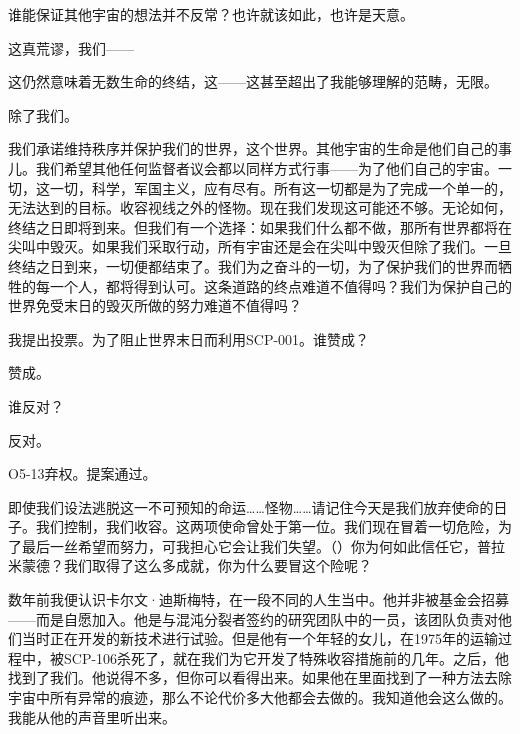 \begin{greenrecordbox}
谁能保证其他宇宙的想法并不反常？也许就该如此，也许是天意。

这真荒谬，我们——

这仍然意味着无数生命的终结，这——这甚至超出了我能够理解的范畴，无限。

除了我们。


我们承诺维持秩序并保护我们的世界，这个世界。其他宇宙的生命是他们自己的事儿。我们希望其他任何监督者议会都以同样方式行事——为了他们自己的宇宙。一切，这一切，科学，军国主义，应有尽有。所有这一切都是为了完成一个单一的，无法达到的目标。收容视线之外的怪物。现在我们发现这可能还不够。无论如何，终结之日即将到来。但我们有一个选择：如果我们什么都不做，那所有世界都将在尖叫中毁灭。如果我们采取行动，所有宇宙还是会在尖叫中毁灭但除了我们。一旦终结之日到来，一切便都结束了。我们为之奋斗的一切，为了保护我们的世界而牺牲的每一个人，都将得到认可。这条道路的终点难道不值得吗？我们为保护自己的世界免受末日的毁灭所做的努力难道不值得吗？


我提出投票。为了阻止世界末日而利用SCP-001。谁赞成？

赞成。

谁反对？

 反对。

O5-13弃权。提案通过。

即使我们设法逃脱这一不可预知的命运……怪物……请记住今天是我们放弃使命的日子。我们控制，我们收容。这两项使命曾处于第一位。我们现在冒着一切危险，为了最后一丝希望而努力，可我担心它会让我们失望。（）你为何如此信任它，普拉米蒙德？我们取得了这么多成就，你为什么要冒这个险呢？


数年前我便认识卡尔文·迪斯梅特，在一段不同的人生当中。他并非被基金会招募——而是自愿加入。他是与混沌分裂者签约的研究团队中的一员，该团队负责对他们当时正在开发的新技术进行试验。但是他有一个年轻的女儿，在1975年的运输过程中，被SCP-106杀死了，就在我们为它开发了特殊收容措施前的几年。之后，他找到了我们。他说得不多，但你可以看得出来。如果他在里面找到了一种方法去除宇宙中所有异常的痕迹，那么不论代价多大他都会去做的。我知道他会这么做的。我能从他的声音里听出来。

\end{greenrecordbox}

\newpage

\begin{center}

\hr

\\

\hr

\end{center}


